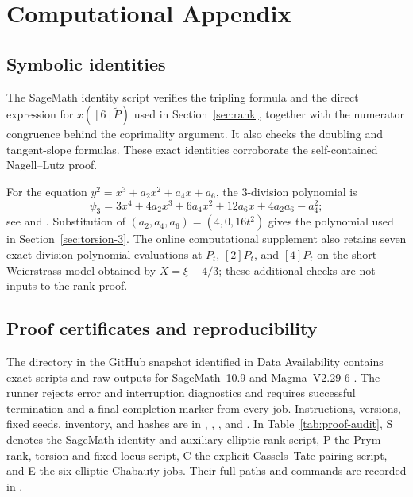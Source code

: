 \documentclass[11pt,a4paper]{amsart}
\theoremstyle{definition}
\theoremstyle{remark}
\numberwithin{equation}{section}
\begin{document}
\appendix

\section{Computational Appendix}\label{app:computational}

\subsection{Symbolic identities}\label{app:divpoly}
The SageMath identity script verifies the tripling formula and the direct
expression for $x([6]\widetilde P)$ used in Section~\ref{sec:rank}, together
with the numerator congruence behind the coprimality argument. It also checks
the doubling and tangent-slope formulas. These exact identities corroborate
the self-contained Nagell--Lutz proof.

For the equation $y^2=x^3+a_2x^2+a_4x+a_6$, the
$3$-division polynomial is
\[
\psi_3=3x^4+4a_2x^3+6a_4x^2+12a_6x+4a_2a_6-a_4^2;
\]
see \cite[Chapter~III, Exercise~3.7]{silverman2009arithmetic} and
\cite[Section~3.2]{washington2008elliptic}. Substitution of
$(a_2,a_4,a_6)=(4,0,16t^2)$ gives the polynomial used in
Section~\ref{sec:torsion-3}. The online computational supplement also retains seven exact
division-polynomial evaluations at $P_t$, $[2]P_t$, and $[4]P_t$
on the short Weierstrass model obtained by $X=\xi-4/3$;
these additional checks are not inputs to the rank proof.

\subsection{Proof certificates and reproducibility}\label{app:verification}

The directory  in the GitHub snapshot identified
in Data Availability contains exact
scripts and raw outputs for SageMath~10.9 \cite{sagemath} and Magma~V2.29-6
\cite{magma}. The runner rejects error and interruption diagnostics and requires
successful termination and a final completion marker from every job. Instructions, versions, fixed seeds, inventory, and hashes are in
, , , and
. In Table~\ref{tab:proof-audit}, S denotes the SageMath identity and
auxiliary elliptic-rank script, P the Prym rank, torsion and fixed-locus
script, C the explicit Cassels--Tate pairing script, and E the six
elliptic-Chabauty jobs. Their full paths and commands are recorded in
.
\end{document}
